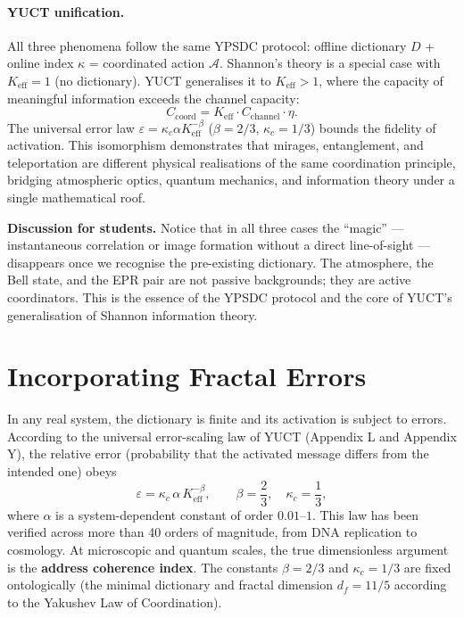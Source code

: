 \documentclass[12pt,a4paper]{article}
\theoremstyle{remark}
\begin{document}
	\paragraph{YUCT unification.}
	All three phenomena follow the same YPSDC protocol: offline dictionary $D$ + online index $\kappa$ = coordinated action $\mathcal{A}$. Shannon's theory is a special case with $K_{\mathrm{eff}}=1$ (no dictionary). YUCT generalises it to $K_{\mathrm{eff}}>1$, where the capacity of meaningful information exceeds the channel capacity:
	\[
	C_{\mathrm{coord}} = K_{\mathrm{eff}} \cdot C_{\mathrm{channel}} \cdot \eta.
	\]
	The universal error law $\varepsilon = \kappa_c \alpha K_{\mathrm{eff}}^{-\beta}$ ($\beta=2/3$, $\kappa_c=1/3$) bounds the fidelity of activation. This isomorphism demonstrates that mirages, entanglement, and teleportation are different physical realisations of the same coordination principle, bridging atmospheric optics, quantum mechanics, and information theory under a single mathematical roof.
	
	\vspace{0.2cm}
	\noindent\textbf{Discussion for students.} 
	Notice that in all three cases the ``magic'' --- instantaneous correlation or image formation without a direct line-of-sight --- disappears once we recognise the pre-existing dictionary. The atmosphere, the Bell state, and the EPR pair are not passive backgrounds; they are active coordinators. This is the essence of the YPSDC protocol and the core of YUCT's generalisation of Shannon information theory.
	
	\section{Incorporating Fractal Errors}
	\label{sec:errors}
	
	In any real system, the dictionary is finite and its activation is subject to errors. According to the universal error-scaling law of YUCT (Appendix L and Appendix Y), the relative error (probability that the activated message differs from the intended one) obeys
	\begin{equation}
		\boxed{\varepsilon = \kappa_c \, \alpha \, K_{\mathrm{eff}}^{-\beta}}, \qquad 
		\beta = \frac{2}{3},\quad \kappa_c = \frac{1}{3},
		\label{eq:error-law-corrected}
	\end{equation}
	where $\alpha$ is a system-dependent constant of order $0.01$--$1$. 	This law has been verified across more than 40 orders of magnitude, from DNA replication to cosmology.  
	At microscopic and quantum scales, the true dimensionless argument is the \textbf{address coherence index}.  The constants $\beta = 2/3$ and $\kappa_c = 1/3$ are fixed ontologically 
	(the minimal dictionary and fractal dimension $d_f = 11/5$ according to the Yakushev Law of Coordination).
	
\end{document}
